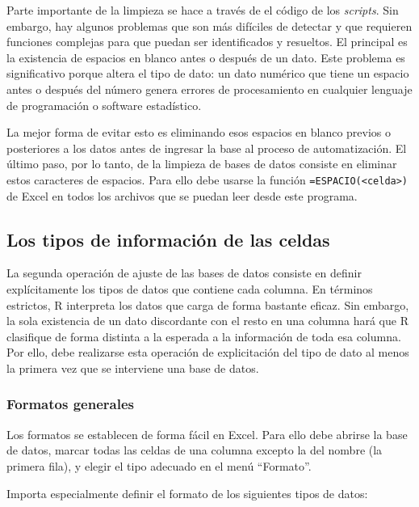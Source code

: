 \documentclass[
  spanish,
]{book}
\begin{document}
Parte importante de la limpieza se hace a través de el código de los \emph{scripts}. Sin embargo, hay algunos problemas que son más difíciles de detectar y que requieren funciones complejas para que puedan ser identificados y resueltos. El principal es la existencia de espacios en blanco antes o después de un dato. Este problema es significativo porque altera el tipo de dato: un dato numérico que tiene un espacio antes o después del número genera errores de procesamiento en cualquier lenguaje de programación o software estadístico.

La mejor forma de evitar esto es eliminando esos espacios en blanco previos o posteriores a los datos antes de ingresar la base al proceso de automatización. El último paso, por lo tanto, de la limpieza de bases de datos consiste en eliminar estos caracteres de espacios. Para ello debe usarse la función \texttt{=ESPACIO(\textless{}celda\textgreater{})} de Excel en todos los archivos que se puedan leer desde este programa.

\hypertarget{los-tipos-de-informaciuxf3n-de-las-celdas}{%
\subsection{Los tipos de información de las celdas}\label{los-tipos-de-informaciuxf3n-de-las-celdas}}

La segunda operación de ajuste de las bases de datos consiste en definir explícitamente los tipos de datos que contiene cada columna. En términos estrictos, R interpreta los datos que carga de forma bastante eficaz. Sin embargo, la sola existencia de un dato discordante con el resto en una columna hará que R clasifique de forma distinta a la esperada a la información de toda esa columna. Por ello, debe realizarse esta operación de explicitación del tipo de dato al menos la primera vez que se interviene una base de datos.

\hypertarget{formatos-generales}{%
\subsubsection{Formatos generales}\label{formatos-generales}}

Los formatos se establecen de forma fácil en Excel. Para ello debe abrirse la base de datos, marcar todas las celdas de una columna excepto la del nombre (la primera fila), y elegir el tipo adecuado en el menú ``Formato''.

Importa especialmente definir el formato de los siguientes tipos de datos:
\end{document}
